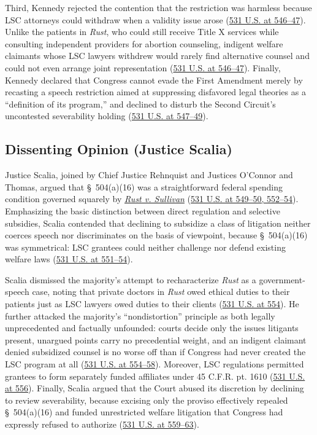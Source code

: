 \documentclass[12pt]{article}
\begin{document}
Third, Kennedy rejected the contention that the restriction was harmless because LSC attorneys could withdraw when a validity issue arose (\href{https://supreme.justia.com/cases/federal/us/531/533/}{531 U.S. at 546--47}). Unlike the patients in \textit{Rust}, who could still receive Title X services while consulting independent providers for abortion counseling, indigent welfare claimants whose LSC lawyers withdrew would rarely find alternative counsel and could not even arrange joint representation (\href{https://supreme.justia.com/cases/federal/us/531/533/}{531 U.S. at 546--47}). Finally, Kennedy declared that Congress cannot evade the First Amendment merely by recasting a speech restriction aimed at suppressing disfavored legal theories as a ``definition of its program,'' and declined to disturb the Second Circuit's uncontested severability holding (\href{https://supreme.justia.com/cases/federal/us/531/533/}{531 U.S. at 547--49}).

\subsection{Dissenting Opinion (Justice Scalia)}
Justice Scalia, joined by Chief Justice Rehnquist and Justices O'Connor and Thomas, argued that \S~504(a)(16) was a straightforward federal spending condition governed squarely by \href{https://supreme.justia.com/cases/federal/us/500/173/}{\textit{Rust v. Sullivan}} (\href{https://supreme.justia.com/cases/federal/us/531/533/}{531 U.S. at 549--50, 552--54}). Emphasizing the basic distinction between direct regulation and selective subsidies, Scalia contended that declining to subsidize a class of litigation neither coerces speech nor discriminates on the basis of viewpoint, because \S~504(a)(16) was symmetrical: LSC grantees could neither challenge nor defend existing welfare laws (\href{https://supreme.justia.com/cases/federal/us/531/533/}{531 U.S. at 551--54}).

Scalia dismissed the majority's attempt to recharacterize \textit{Rust} as a government-speech case, noting that private doctors in \textit{Rust} owed ethical duties to their patients just as LSC lawyers owed duties to their clients (\href{https://supreme.justia.com/cases/federal/us/531/533/}{531 U.S. at 554}). He further attacked the majority's ``nondistortion'' principle as both legally unprecedented and factually unfounded: courts decide only the issues litigants present, unargued points carry no precedential weight, and an indigent claimant denied subsidized counsel is no worse off than if Congress had never created the LSC program at all (\href{https://supreme.justia.com/cases/federal/us/531/533/}{531 U.S. at 554--58}). Moreover, LSC regulations permitted grantees to form separately funded affiliates under 45 C.F.R. pt. 1610 (\href{https://supreme.justia.com/cases/federal/us/531/533/}{531 U.S. at 556}). Finally, Scalia argued that the Court abused its discretion by declining to review severability, because excising only the proviso effectively repealed \S~504(a)(16) and funded unrestricted welfare litigation that Congress had expressly refused to authorize (\href{https://supreme.justia.com/cases/federal/us/531/533/}{531 U.S. at 559--63}).
\end{document}
